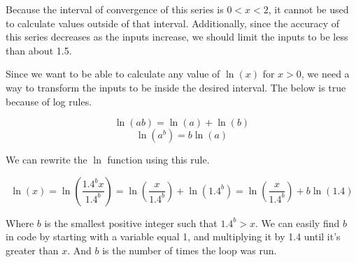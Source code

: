 \documentclass[12pt, letterpaper]{article}
\begin{document}
Because the interval of convergence of this series is $0<x<2$, it cannot be used to calculate values outside of that interval. Additionally, since the accuracy of this series decreases as the inputs increase, we should limit the inputs to be less than about 1.5.

\begin{center}
\end{center}

Since we want to be able to calculate any value of $\ln(x)$ for $x>0$, we need a way to transform the inputs to be inside the desired interval. The below is true because of log rules.

\[ \ln(ab) = \ln(a) + \ln(b) \]
\[ \ln(a^b) = b\ln(a) \]

We can rewrite the $\ln$ function using this rule.

\[ \ln(x) = \ln\left(\frac{1.4^bx}{1.4^b}\right) = \ln\left(\frac{x}{1.4^b}\right) + \ln\left(1.4^b\right) = \ln\left(\frac{x}{1.4^b}\right) + b\ln\left(1.4\right) \]

Where $b$ is the smallest positive integer such that $1.4^b>x$. We can easily find $b$ in code by starting with a variable equal 1, and multiplying it by 1.4 until it's greater than $x$. And $b$ is the number of times the loop was run.

\end{document}
